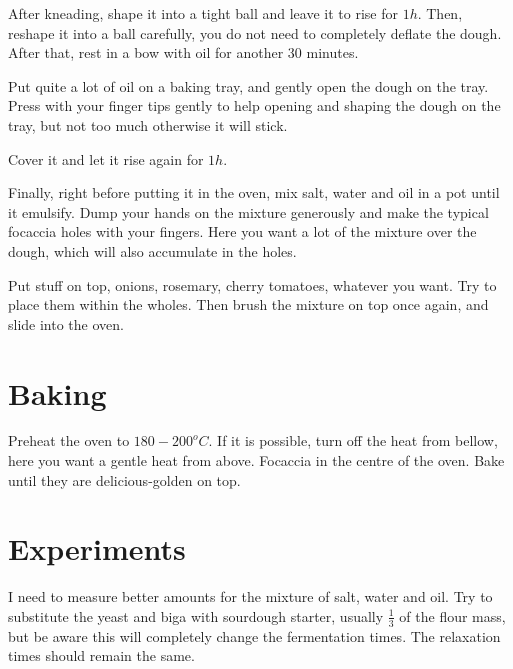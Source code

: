 After kneading, shape it into a tight ball and leave it to rise for $1h$.
%
Then, reshape it into a ball carefully, you do not need to completely deflate the dough.
%
After that, rest in a bow with oil for another $30$ minutes.


Put quite a lot of oil on a baking tray, and gently open the dough on the tray.
%
Press with your finger tips gently to help opening and shaping the dough on the tray, but not too much otherwise it will stick.

Cover it and let it rise again for $1h$.

Finally, right before putting it in the oven, mix salt, water and oil in a pot until it emulsify.
%
Dump your hands on the mixture generously and make the typical focaccia holes with your fingers. Here you want a lot of the mixture over the dough, which will also accumulate in the holes.

Put stuff on top, onions, rosemary, cherry tomatoes, whatever you want. Try to place them within the wholes. 
%
Then brush the mixture on top once again, and slide into the oven.

\section{Baking}

Preheat the oven to $180-200^oC$. If it is possible, turn off the heat from bellow, here you want a gentle heat from above.
% 
Focaccia in the centre of the oven.
%
Bake until they are delicious-golden on top.

\section{Experiments}

I need to measure better amounts for the mixture of salt, water and oil.
%
Try to substitute the yeast and biga with sourdough starter, usually $\frac{1}{3}$ of the flour mass, but be aware this will completely change the fermentation times. The relaxation times should remain the same.


